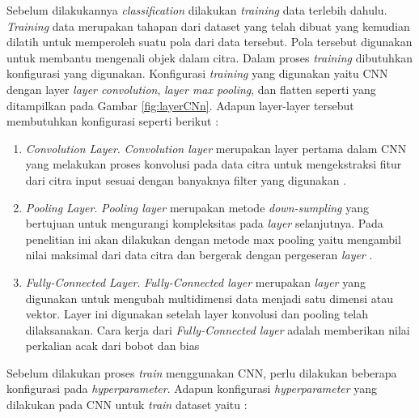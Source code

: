 Sebelum dilakukannya \emph{classification} dilakukan \emph{training} data terlebih dahulu. \emph{Training} data merupakan tahapan dari dataset yang telah dibuat yang kemudian dilatih untuk memperoleh suatu pola dari data tersebut. Pola tersebut digunakan untuk membantu mengenali objek dalam citra. Dalam proses \emph{training} dibutuhkan konfigurasi yang digunakan. Konfigurasi \emph{training} yang digunakan yaitu CNN dengan layer \emph{layer convolution}, \emph{layer max pooling},  dan flatten seperti yang ditampilkan pada Gambar \ref*{fig:layerCNn}. Adapun layer-layer tersebut membutuhkan konfigurasi seperti berikut :
\begin{enumerate}
  \item \emph{Convolution Layer}. \emph{Convolution layer} merupakan layer pertama dalam CNN yang melakukan proses konvolusi pada data citra untuk mengekstraksi fitur dari citra input sesuai dengan banyaknya filter yang digunakan \parencite{konvolusilayer}. 
  \item \emph{Pooling Layer}. \emph{Pooling layer} merupakan metode \emph{down-sumpling} yang bertujuan untuk mengurangi kompleksitas pada \emph{layer} selanjutnya. Pada penelitian ini akan dilakukan dengan metode max pooling yaitu mengambil nilai maksimal dari data citra dan bergerak dengan pergeseran \emph{layer} \parencite{poolilayer}.
  \item \emph{Fully-Connected Layer}. \emph{Fully-Connected layer} merupakan \emph{layer} yang digunakan untuk mengubah multidimensi data menjadi satu dimensi atau vektor. Layer ini digunakan setelah layer konvolusi dan pooling telah dilaksanakan. Cara kerja dari \emph{Fully-Connected layer} adalah memberikan nilai perkalian acak dari bobot dan bias \parencite{flayenlayer}
\end{enumerate}
Sebelum dilakukan proses \emph{train} menggunakan CNN, perlu dilakukan beberapa konfigurasi pada \emph{hyperparameter}. Adapun konfigurasi \emph{hyperparameter} yang dilakukan pada CNN untuk \emph{train} dataset yaitu :
